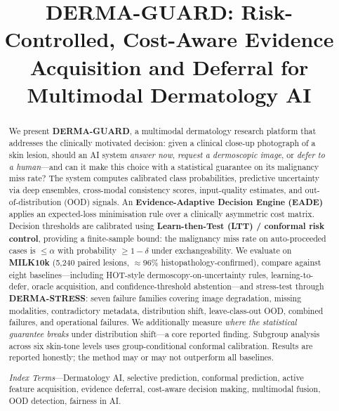 \documentclass[conference]{IEEEtran}
\newcommand{\1}{\mathbf{1}}
\begin{document}
\title{\textbf{DERMA-GUARD}: Risk-Controlled, Cost-Aware Evidence
  Acquisition and Deferral for Multimodal Dermatology AI}

\author{%
}

\maketitle

\begin{abstract}
We present \textbf{DERMA-GUARD}, a multimodal dermatology research platform
that addresses the clinically motivated decision: given a clinical close-up
photograph of a skin lesion, should an AI system \emph{answer now},
\emph{request a dermoscopic image}, or \emph{defer to a human}---and can it
make this choice with a statistical guarantee on its malignancy miss rate?
The system computes calibrated class probabilities, predictive uncertainty
via deep ensembles, cross-modal consistency scores, input-quality estimates,
and out-of-distribution (OOD) signals. An \textbf{Evidence-Adaptive Decision
Engine (EADE)} applies an expected-loss minimisation rule over a clinically
asymmetric cost matrix. Decision thresholds are calibrated using
\textbf{Learn-then-Test (LTT) / conformal risk control}, providing a
finite-sample bound: the malignancy miss rate on auto-proceeded cases is
$\leq\!\alpha$ with probability $\geq\!1-\delta$ under exchangeability.
We evaluate on \textbf{MILK10k} (5,240 paired lesions, $\approx$96\%
histopathology-confirmed), compare against eight baselines---including
HOT-style dermoscopy-on-uncertainty rules, learning-to-defer, oracle
acquisition, and confidence-threshold abstention---and stress-test through
\textbf{DERMA-STRESS}: seven failure families covering image degradation,
missing modalities, contradictory metadata, distribution shift,
leave-class-out OOD, combined failures, and operational failures. We
additionally measure \emph{where the statistical guarantee breaks} under
distribution shift---a core reported finding. Subgroup analysis across six
skin-tone levels uses group-conditional conformal calibration. Results are
reported honestly; the method may or may not outperform all baselines.

\vspace{2pt}
\textit{Index Terms}---Dermatology AI, selective prediction, conformal
prediction, active feature acquisition, evidence deferral, cost-aware
decision making, multimodal fusion, OOD detection, fairness in AI.
\end{abstract}
\end{document}
